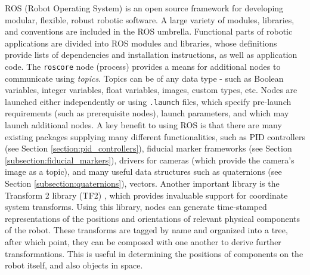 ROS (Robot Operating System) \cite{ros} is an open source framework for developing modular, flexible, robust robotic software. A large variety of modules, libraries, and conventions are included in the \gls{ROS} umbrella. Functional parts of robotic applications are divided into \gls{ROS} modules and libraries, whose definitions provide lists of dependencies and installation instructions, as well as application code. The \texttt{roscore} node (process) provides a means for additional nodes to communicate using \textit{topics}. Topics can be of any data type - such as Boolean variables, integer variables, float variables, images, custom types, etc. Nodes are launched either independently or using \texttt{.launch} files, which specify pre-launch requirements (such as prerequisite nodes), launch parameters, and which may launch additional nodes. A key benefit to using \gls{ROS} is that there are many existing packages supplying many different functionalities, such as \gls{PID} controllers (see Section \ref{section:pid_controllers}), fiducial marker frameworks (see Section \ref{subsection:fiducial_markers}), drivers for cameras (which provide the camera's image as a topic), and many useful data structures such as quaternions (see Section \ref{subsection:quaternions}), vectors. Another important library is the Transform 2 library (TF2) \cite{tf2}, which provides invaluable support for coordinate system transforms. Using this library, nodes can generate time-stamped representations of the positions and orientations of relevant physical components of the robot. These transforms are tagged by name and organized into a tree, after which point, they can be composed with one another to derive further transformations. This is useful in determining the positions of components on the robot itself, and also objects in space.